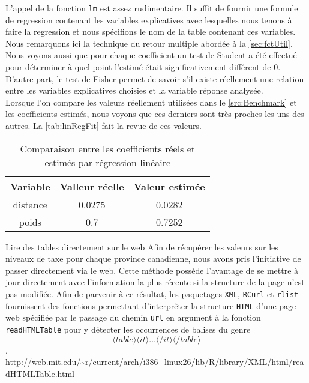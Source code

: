 \vspace{\baselineskip}
L'appel de la fonction \texttt{lm} est assez rudimentaire. Il suffit de fournir une formule de regression contenant les variables explicatives avec lesquelles nous tenons à faire la regression et nous spécifions le nom de la table contenant ces variables. Nous remarquons ici la technique du retour multiple abordée à la \autoref{sec:fctUtil}. Nous voyons aussi que pour chaque coefficient un test de Student a été effectué pour déterminer à quel point l'estimé était significativement différent de 0. D'autre part, le test de Fisher permet de savoir s'il existe réellement une relation entre les variables explicatives choisies et la variable réponse analysée. \cite{outputLM} \\

Lorsque l'on compare les valeurs réellement utilisées dans le \autoref{src:Benchmark} et les coefficients estimés, nous voyons que ces derniers sont très proches les uns des autres. La \autoref{tab:linRegFit} fait la revue de ces valeurs. \\

\begin{table}[h]
	\centering
	\begin{tabular}{ccc}
		\textbf{Variable} & \textbf{Valleur réelle} & \textbf{Valeur estimée} \\
		\hline
		distance & 0.0275 & 0.0282 \\
		poids & 0.7 & 0.7252		
	\end{tabular}
	\caption{Comparaison entre les coefficients réels et estimés par régression linéaire}
	\label{tab:linRegFit}
\end{table}

\begin{moreInfo}{Lire des tables directement sur le web}
	Afin de récupérer les valeurs sur les niveaux de taxe pour chaque province canadienne, nous avons pris l'initiative de passer directement via le web. Cette méthode possède l'avantage de se mettre à jour directement avec l'information la plus récente si la structure de la page n'est pas modifiée. Afin de parvenir à ce résultat, les paquetages \texttt{XML}, \texttt{RCurl} et \texttt{rlist} fournissent des fonctions permettant d'interprêter la structure \texttt{HTML} d'une page web spécifiée par le passage du chemin \texttt{url} en argument à la fonction \texttt{readHTMLTable} pour y détecter les occurrences de balises du genre $$\langle table \rangle \langle it \rangle \dots \langle /it \rangle \langle /table \rangle$$.
	\url{http://web.mit.edu/~r/current/arch/i386_linux26/lib/R/library/XML/html/readHTMLTable.html}
\end{moreInfo}
